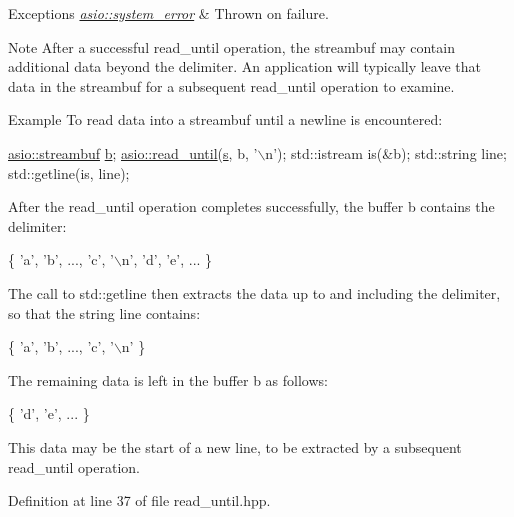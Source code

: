 \begin{DoxyExceptions}{Exceptions}
{\em \hyperlink{classasio_1_1system__error}{asio\+::system\+\_\+error}} & Thrown on failure.\\
\hline
\end{DoxyExceptions}
\begin{DoxyNote}{Note}
After a successful read\+\_\+until operation, the streambuf may contain additional data beyond the delimiter. An application will typically leave that data in the streambuf for a subsequent read\+\_\+until operation to examine.
\end{DoxyNote}
\begin{DoxyParagraph}{Example}
To read data into a streambuf until a newline is encountered\+: 
\begin{DoxyCode}
 \hyperlink{classasio_1_1basic__streambuf}{asio::streambuf} \hyperlink{group__async__read_ga945a5c18fa77a9e2eba420f8f44b2a4f}{b};
\hyperlink{group__read__until_ga1aae2baa82596a6a9ad320e80b016006}{asio::read\_until}(\hyperlink{group__async__connect_ga31ab74b9ea6c77932dddd016cfc7920a}{s}, b, \textcolor{charliteral}{'\(\backslash\)n'});
std::istream is(&b);
std::string line;
std::getline(is, line); 
\end{DoxyCode}
 After the {\ttfamily read\+\_\+until} operation completes successfully, the buffer {\ttfamily b} contains the delimiter\+: 
\begin{DoxyCode}
\{ \textcolor{charliteral}{'a'}, \textcolor{charliteral}{'b'}, ..., \textcolor{charliteral}{'c'}, \textcolor{charliteral}{'\(\backslash\)n'}, \textcolor{charliteral}{'d'}, \textcolor{charliteral}{'e'}, ... \} 
\end{DoxyCode}
 The call to {\ttfamily std\+::getline} then extracts the data up to and including the delimiter, so that the string {\ttfamily line} contains\+: 
\begin{DoxyCode}
\{ \textcolor{charliteral}{'a'}, \textcolor{charliteral}{'b'}, ..., \textcolor{charliteral}{'c'}, \textcolor{charliteral}{'\(\backslash\)n'} \} 
\end{DoxyCode}
 The remaining data is left in the buffer {\ttfamily b} as follows\+: 
\begin{DoxyCode}
\{ \textcolor{charliteral}{'d'}, \textcolor{charliteral}{'e'}, ... \} 
\end{DoxyCode}
 This data may be the start of a new line, to be extracted by a subsequent {\ttfamily read\+\_\+until} operation. 
\end{DoxyParagraph}


Definition at line 37 of file read\+\_\+until.\+hpp.

